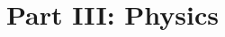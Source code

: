 \documentclass[12pt]{book}
\begin{document}
\title{Part III: Physics}
\dominitoc
\tableofcontents






\end{document}
